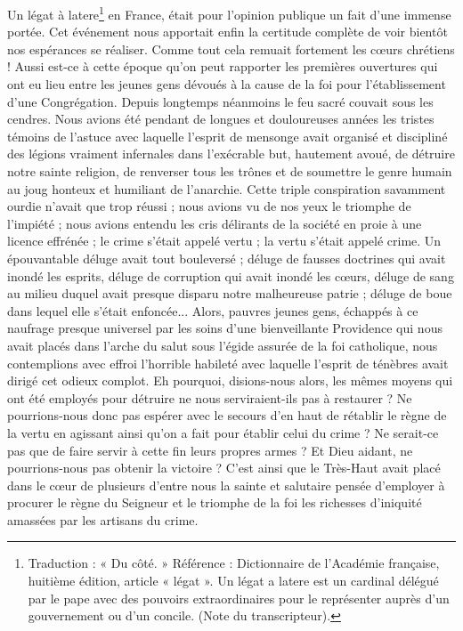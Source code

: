 Un légat à latere\footnote{Traduction : « Du côté. » Référence : Dictionnaire de l’Académie française, huitième édition, article « légat ». Un légat a latere est un cardinal délégué par le pape avec des pouvoirs extraordinaires pour le représenter auprès d’un gouvernement ou d’un concile. (Note du transcripteur).} en France, était pour l'opinion
publique un fait d'une immense portée. Cet événement nous apportait enfin la certitude complète de voir bientôt nos espérances se réaliser. Comme tout cela remuait fortement les cœurs chrétiens ! Aussi est-ce à cette époque qu'on peut rapporter les premières ouvertures qui ont eu lieu entre les jeunes gens dévoués à la cause de la foi pour l'établissement d'une Congrégation. Depuis longtemps néanmoins le feu sacré couvait sous les cendres. Nous avions été pendant de longues et douloureuses années les tristes témoins de l'astuce avec laquelle l'esprit de mensonge avait organisé et discipliné des légions vraiment infernales dans l'exécrable but, hautement avoué, de détruire notre sainte religion, de renverser tous les trônes et de soumettre le genre humain au joug honteux et humiliant de l'anarchie. Cette triple conspiration savamment ourdie n'avait que trop réussi ; nous avions vu de nos yeux le triomphe de l'impiété ; nous avions entendu les cris délirants de la société en proie à une licence effrénée ; le crime s'était appelé vertu ; la vertu s'était appelé crime. Un épouvantable déluge avait tout bouleversé ; déluge de fausses doctrines qui avait inondé les esprits, déluge de corruption qui avait inondé les cœurs, déluge de sang au milieu duquel avait presque disparu notre malheureuse patrie ; déluge de boue dans lequel elle s'était enfoncée... Alors, pauvres jeunes gens, échappés à ce naufrage presque universel par les soins d'une bienveillante Providence qui nous avait placés dans
l'arche du salut sous l'égide assurée de la foi catholique, nous contemplions avec effroi l'horrible habileté avec laquelle l'esprit de ténèbres avait dirigé cet odieux complot. Eh pourquoi, disions-nous alors, les mêmes moyens qui ont été employés pour détruire ne nous serviraient-ils pas à restaurer ? Ne pourrions-nous donc pas espérer avec le secours d'en haut de rétablir le règne de la vertu en agissant ainsi qu'on a fait pour établir celui du crime ? Ne serait-ce pas que de faire servir à cette fin leurs propres armes ? Et Dieu aidant, ne pourrions-nous pas obtenir la victoire ? C'est ainsi que le Très-Haut avait placé dans le cœur de plusieurs d'entre nous la sainte et salutaire pensée d'employer à procurer le règne du Seigneur et le triomphe de la foi les richesses d'iniquité amassées par les artisans du crime.

